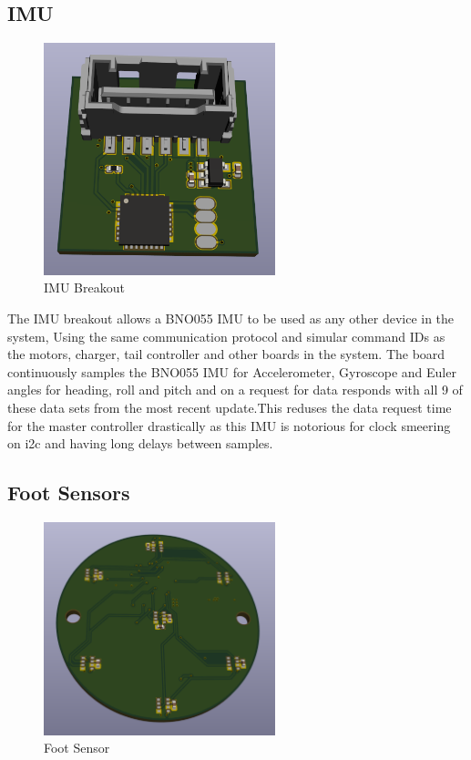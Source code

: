 \subsection{IMU}
\begin{figure}[H]
       \centering
       \includegraphics[width=0.6\textwidth]{figures/IMU.png}
       \caption{IMU Breakout}
       \label{fig:IMUPCB}
   \end{figure}
   The IMU breakout allows a BNO055 IMU to be used as any other device in the system, Using the same communication protocol and simular command IDs as the motors, charger, tail controller and other boards in the system. The board continuously samples the BNO055 IMU for Accelerometer, Gyroscope and Euler angles for heading, roll and pitch and on a request for data responds with all 9 of these data sets from the most recent update.This reduses the data request time for the master controller drastically as this IMU is notorious for clock smeering on i2c and having long delays between samples.
   
\subsection{Foot Sensors}
\begin{figure}[H]
       \centering
       \includegraphics[width=0.6\textwidth]{figures/FootSensor.png}
       \caption{Foot Sensor}
       \label{fig:FootSensorPCB}
   \end{figure}
